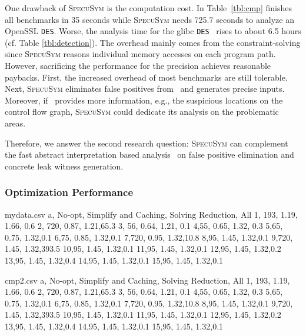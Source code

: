 \documentclass[sigconf, review]{acmart}
\newcommand{\SpecuSym}{\textsc{SpecuSym} }
\begin{document}
One drawback of \SpecuSym is the computation cost. In Table~\ref{tbl:cmp}
\cite{WuW19} finishes all benchmarks in 35 seconds while \SpecuSym needs 
725.7 seconds to analyze an OpenSSL \texttt{DES}. Worse, the analysis time 
for the glibc \texttt{DES}~\cite{glibc} rises to about 6.5 hours (cf. Table
\ref{tbl:detection}). The overhead mainly comes from the constraint-solving 
since \SpecuSym reasons individual memory accesses on each program path. 
However, sacrificing the performance for the precision achieves reasonable 
paybacks. First, the increased overhead of most benchmarks are still tolerable.
Next, \SpecuSym eliminates false positives from~\cite{WuW19} and generates 
precise inputs. Moreover, if~\cite{WuW19} provides more information, e.g., 
the suspicious locations on the control flow graph, \SpecuSym could dedicate 
its analysis on the problematic areas. 


Therefore, we answer the second research question: \SpecuSym can complement 
the fast abstract interpretation based analysis~\cite{WuW19} on false positive 
elimination and concrete leak witness generation.




\subsubsection{Optimization Performance}
\label{sec:opt_perform}


\begin{filecontents*}{mydata.csv}
a, No-opt, Simplify and Caching, Solving Reduction, All
1, 193, 1.19, 1.66, 0.6 
2, 720, 0.87, 1.21,65.3 
3, 56, 0.64, 1.21, 0.1 
4,55, 0.65, 1.32, 0.3 
5,65, 0.75, 1.32,0.1 
6,75, 0.85, 1.32,0.1 
7,720, 0.95, 1.32,10.8 
8,95, 1.45, 1.32,0.1 
9,720, 1.45, 1.32,393.5 
10,95, 1.45, 1.32,0.1 
11,95, 1.45, 1.32,0.1 
12,95, 1.45, 1.32,0.2 
13,95, 1.45, 1.32,0.4 
14,95, 1.45, 1.32,0.1 
15,95, 1.45, 1.32,0.1 
\end{filecontents*}

\begin{filecontents*}{cmp2.csv}
a, No-opt, Simplify and Caching, Solving Reduction, All
1, 193, 1.19, 1.66, 0.6 
2, 720, 0.87, 1.21,65.3 
3, 56, 0.64, 1.21, 0.1 
4,55, 0.65, 1.32, 0.3 
5,65, 0.75, 1.32,0.1 
6,75, 0.85, 1.32,0.1 
7,720, 0.95, 1.32,10.8 
8,95, 1.45, 1.32,0.1 
9,720, 1.45, 1.32,393.5 
10,95, 1.45, 1.32,0.1 
11,95, 1.45, 1.32,0.1 
12,95, 1.45, 1.32,0.2 
13,95, 1.45, 1.32,0.4 
14,95, 1.45, 1.32,0.1 
15,95, 1.45, 1.32,0.1 
\end{filecontents*}
\end{document}
